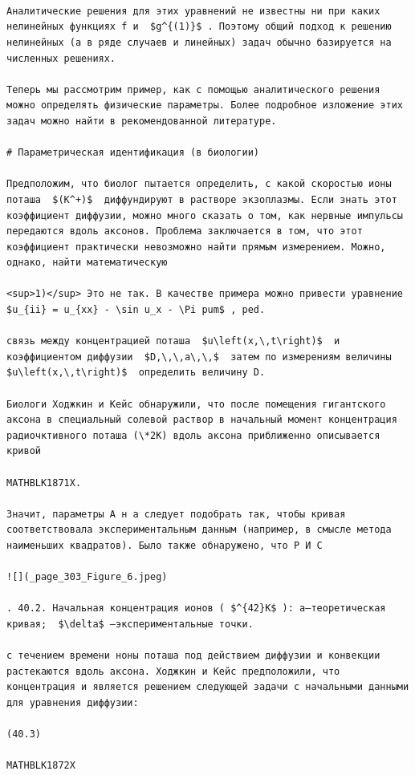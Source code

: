 \documentclass[
]{article}
\begin{document}
\begin{verbatim}

  

Аналитические решения для этих уравнений не известны ни при каких нелинейных функциях f и  $g^{(1)}$ . Поэтому общий подход к решению нелинейных (а в ряде случаев и линейных) задач обычно базируется на численных решениях.

Теперь мы рассмотрим пример, как с помощью аналитического решения можно определять физические параметры. Более подробное изложение этих задач можно найти в рекомендованной литературе.

# Параметрическая идентификация (в биологии)

Предположим, что биолог пытается определить, с какой скоростью ионы поташа  $(K^+)$  диффундируют в растворе экзоплазмы. Если знать этот коэффициент диффузии, можно много сказать о том, как нервные импульсы передаются вдоль аксонов. Проблема заключается в том, что этот коэффициент практически невозможно найти прямым измерением. Можно, однако, найти математическую

<sup>1)</sup> Это не так. В качестве примера можно привести уравнение  $u_{ii} = u_{xx} - \sin u_x - \Pi pum$ , ped.

связь между концентрацией поташа  $u\left(x,\,t\right)$  и коэффициентом диффузии  $D,\,\,a\,\,$  затем по измерениям величины  $u\left(x,\,t\right)$  определить величину D.

Биологи Ходжкин и Кейс обнаружили, что после помещения гигантского аксона в специальный солевой раствор в начальный момент концентрация радиочктивного поташа (\*2K) вдоль аксона приближенно описывается кривой

MATHBLK1871X.

Значит, параметры A н a следует подобрать так, чтобы кривая соответствовала экспериментальным данным (например, в смысле метода наименьших квадратов). Было также обнаружено, что Р И С

![](_page_303_Figure_6.jpeg)

. 40.2. Начальная концентрация ионов ( $^{42}K$ ): a—теоретическая кривая;  $\delta$ —экспериментальные точки.

с течением времени ноны поташа под действием диффузии и конвекции растекаются вдоль аксона. Ходжкин и Кейс предположили, что концентрация и является решением следующей задачи с начальными данными для уравнения диффузии:

(40.3) 

MATHBLK1872X


\end{verbatim}
\end{document}
